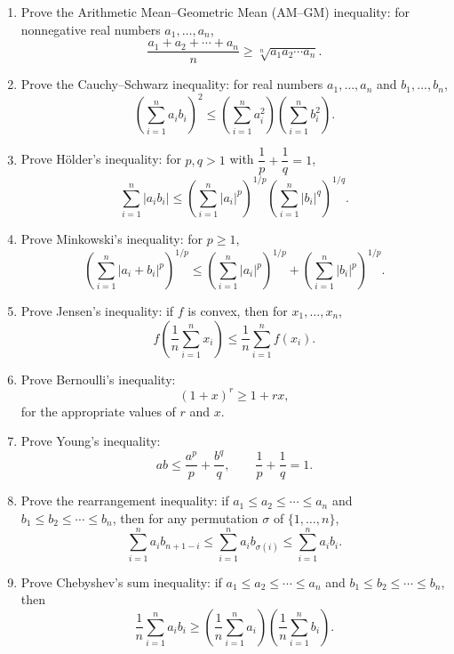 \documentclass{essay}
\begin{document}
\begin{enumerate}[resume]

    \item Prove the Arithmetic Mean--Geometric Mean (AM--GM) inequality: for nonnegative real numbers \(a_1,\dots,a_n\),
    \[
        \frac{a_1+a_2+\cdots+a_n}{n}
        \ge
        \sqrt[n]{a_1 a_2 \cdots a_n}.
    \]

    \item Prove the Cauchy--Schwarz inequality: for real numbers \(a_1,\dots,a_n\) and \(b_1,\dots,b_n\),
    \[
        \left(\sum_{i=1}^n a_i b_i\right)^{\!2}
        \le
        \left(\sum_{i=1}^n a_i^2\right)
        \left(\sum_{i=1}^n b_i^2\right).
    \]

    \item Prove Hölder's inequality: for \(p,q>1\) with \(\dfrac{1}{p}+\dfrac{1}{q}=1\),
    \[
        \sum_{i=1}^n |a_i b_i|
        \le
        \left(\sum_{i=1}^n |a_i|^p\right)^{\!1/p}
        \left(\sum_{i=1}^n |b_i|^q\right)^{\!1/q}.
    \]

    \item Prove Minkowski's inequality: for \(p\ge1\),
    \[
        \left(\sum_{i=1}^n |a_i+b_i|^p\right)^{\!1/p}
        \le
        \left(\sum_{i=1}^n |a_i|^p\right)^{\!1/p}
        +
        \left(\sum_{i=1}^n |b_i|^p\right)^{\!1/p}.
    \]

    \item Prove Jensen's inequality: if \(f\) is convex, then for \(x_1,\dots,x_n\),
    \[
        f\!\left(\frac{1}{n}\sum_{i=1}^n x_i\right)
        \le
        \frac{1}{n}\sum_{i=1}^n f(x_i).
    \]

    \item Prove Bernoulli's inequality:
    \[
        (1+x)^r \ge 1+rx,
    \]
    for the appropriate values of \(r\) and \(x\).

    \item Prove Young's inequality:
    \[
        ab
        \le
        \frac{a^p}{p}
        +
        \frac{b^q}{q},
        \qquad
        \frac{1}{p}+\frac{1}{q}=1.
    \]

    \item Prove the rearrangement inequality: if \(a_1\le a_2\le\cdots\le a_n\) and \(b_1\le b_2\le\cdots\le b_n\), then for any permutation \(\sigma\) of \(\{1,\dots,n\}\),
    \[
        \sum_{i=1}^n a_i b_{n+1-i}
        \le
        \sum_{i=1}^n a_i b_{\sigma(i)}
        \le
        \sum_{i=1}^n a_i b_i.
    \]

    \item Prove Chebyshev's sum inequality: if \(a_1\le a_2\le\cdots\le a_n\) and \(b_1\le b_2\le\cdots\le b_n\), then
    \[
        \frac{1}{n}\sum_{i=1}^n a_i b_i
        \ge
        \left(\frac{1}{n}\sum_{i=1}^n a_i\right)
        \left(\frac{1}{n}\sum_{i=1}^n b_i\right).
    \]


\end{enumerate}
\end{document}

